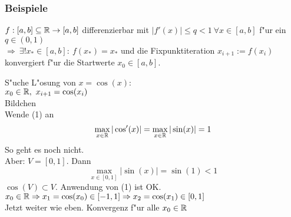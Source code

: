 \documentclass{scrartcl}
\begin{document}
\subsubsection{Beispiele}
\begin{1aufz}
\item $f: [a,b] \subseteq \mathbb{R} \rightarrow [a,b]$ differenzierbar mit $\vert f'(x) \vert \leq q < 1 \ \forall x \in [a,b]$ f"ur ein $q \in (0,1)$ \\
$\Rightarrow \ \exists! x_* \in [a,b]: \ f(x_*) = x_*$ und die Fixpunktiteration $x_{i+1} := f(x_i)$ konvergiert f"ur die Startwerte $x_0 \in [a,b]$. 
\item S"uche L"osung von $x = \cos(x)$: \\
$x_0 \in \mathbb{R}, \ x_{i+1} = \cos(x_i)$ \\
Bildchen \\
Wende (1) an
$$\max\limits_{x \in \mathbb{R}} \vert \cos'(x) \vert = \max\limits_{x \in \mathbb{R}} \vert \sin(x) \vert = 1 $$
So geht es noch nicht. \\
Aber: $V = [0,1]$. Dann
$$\max\limits_{x \in [0,1]} \vert \sin(x) \vert = \sin(1) < 1$$
$\cos(V) \subset V$. Anwendung von (1) ist OK. \\
$x_0 \in \mathbb{R} \Rightarrow x_1 = \cos(x_0) \in [-1,1] \Rightarrow x_2 = \cos(x_1) \in [0,1]$ \\
Jetzt weiter wie eben. Konvergenz f"ur alle $x_0 \in \mathbb{R}$
\end{1aufz}
\end{document}
